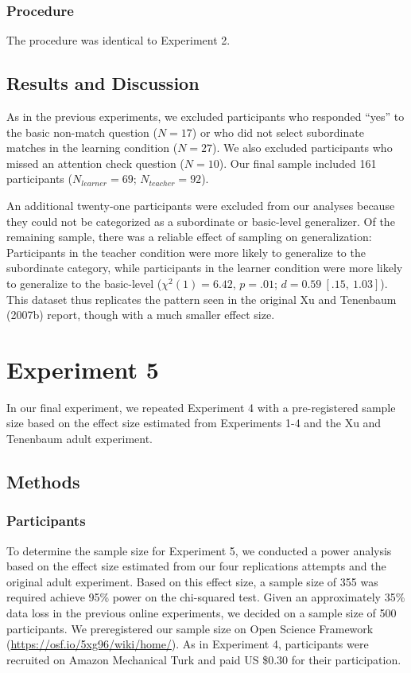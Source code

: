\documentclass[man]{apa2}
\begin{document}
\subsubsection{Procedure}
The procedure was identical to Experiment 2.

\subsection{Results and Discussion}

As in the previous experiments, we excluded participants who responded ``yes'' to the basic non-match question ($N=17$) or who did not select subordinate matches in the learning condition ($N = 27$). We also excluded participants who missed an attention check question ($N = 10$). Our final sample included 161 participants ($N_{learner} = 69$; $N_{teacher} = 92$).

An additional twenty-one participants were excluded from our analyses because they could not be categorized as a subordinate or basic-level generalizer. Of the remaining sample, there was a reliable effect of sampling on generalization: Participants in the teacher condition were more likely to generalize to the subordinate category, while participants in the learner condition were more likely to generalize to the basic-level ($\chi^2(1) = 6.42$, $p = .01$; $d = 0.59\ [.15,\ 1.03]$). This dataset thus replicates the pattern seen in the original Xu and Tenenbaum (2007b) report, though with a much smaller effect size.

\section{Experiment 5}
In our final experiment, we repeated Experiment 4 with a pre-registered sample size based on the effect size estimated from Experiments 1-4 and the Xu and Tenenbaum adult experiment. 

\subsection{Methods}

\subsubsection{Participants}  To determine the sample size for Experiment 5, we conducted a power analysis based on the effect size estimated from our four replications attempts and the original adult experiment. Based on this  effect size, a sample size of 355 was required  achieve 95\% power on the chi-squared test. Given an approximately 35\% data loss in the previous online experiments, we decided on a sample size of 500 participants. We preregistered our sample size on Open Science Framework (\url{https://osf.io/5xg96/wiki/home/}). As in Experiment 4, participants were recruited on Amazon Mechanical Turk and  paid US \$0.30 for their participation.
\end{document}
